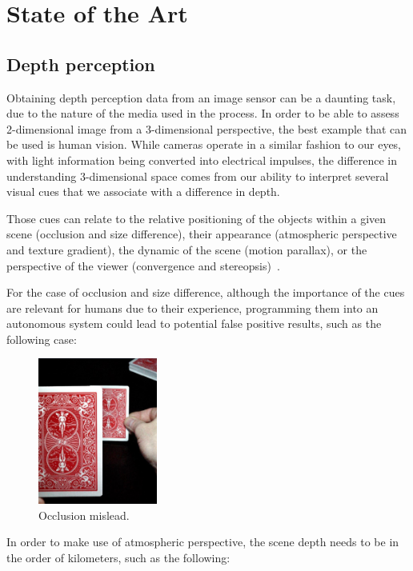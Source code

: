 \section{State of the Art}

\subsection{Depth perception}

Obtaining depth perception data from an image sensor can be a daunting
task, due to the nature of the media used in the process. In order to be 
able to assess  2-dimensional image from a 3-dimensional perspective, the
best example that can be used is human vision. While cameras operate in a
similar fashion to our eyes, with light information being converted into 
electrical impulses, the difference in understanding 3-dimensional space
comes from our ability to interpret several visual cues that we associate 
with a difference in depth.

Those cues can relate to the relative positioning of the objects within a 
given scene (occlusion and size difference), their appearance (atmospheric
perspective and texture gradient), the dynamic of the scene (motion parallax),
or the perspective of the viewer (convergence and stereopsis)~\cite{withGeneralDepth}.

For the case of occlusion and size difference, although the importance of the cues
are relevant for humans due to their experience, programming them into an autonomous
system could lead to potential false positive results, such as the following case:

\begin{figure}[H]
    \includegraphics[width=0.35\textwidth, height=0.35\textwidth]{resources/png/occlusion_mislead.png}
    \caption{Occlusion mislead.~\cite{withGeneralDepth}~\label{figMislead}}
\end{figure}

In order to make use of atmospheric perspective, the scene depth needs to be in the
order of kilometers, such as the following:

